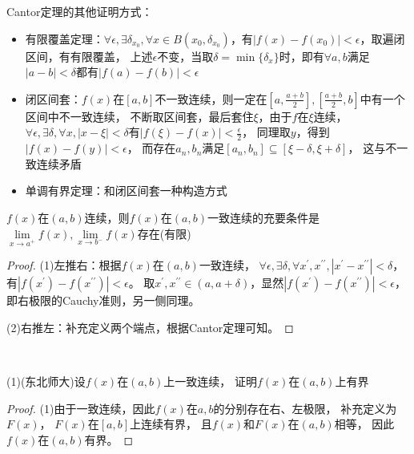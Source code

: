 \begin{note}
  Cantor定理的其他证明方式：
  \begin{itemize}
  \item 有限覆盖定理：$\forall \epsilon, \exists \delta_{x_0}, \forall x \in B(x_0,\delta_{x_0})$，有$|f(x) - f(x_0)| < \epsilon$，取遍闭区间，有有限覆盖，
    上述$\epsilon$不变，当取$\delta = \min \{\delta_x\}$时，即有$\forall a,b $满足$|a-b| < \delta$都有$|f(a) - f(b)| < \epsilon$
  \item 闭区间套：$f(x)$在$[a,b]$不一致连续，则一定在$[a,\frac{a+b}{2}],[\frac{a+b}{2},b]$中有一个区间中不一致连续，
    不断取区间套，最后套住$\xi$，由于$f$在$\xi$连续，$\forall \epsilon, \exists \delta, \forall x, |x - \xi| < \delta$有$|f(\xi) - f(x)| < \frac{\epsilon}{2}$，
    同理取$y$，得到$|f(x )- f(y)| < \epsilon$，
    而存在$a_n,b_n$满足$[a_n,b_n] \subseteq [\xi - \delta, \xi + \delta]$，
    这与不一致连续矛盾
  \item 单调有界定理：和闭区间套一种构造方式
  \end{itemize}
\end{note}



\begin{theorem}[开区间一致连续充要条件]
  $f(x)$在$(a,b)$连续，则$f(x)$在$(a,b)$一致连续的充要条件是$\lim \limits _{x \rightarrow a^+} f(x), \lim \limits _{x \rightarrow b^-}f(x)$存在(有限)
\end{theorem}

\begin{proof}
  (1)左推右：根据$f(x)$在$(a,b)$一致连续，
  $\forall \epsilon, \exists \delta, \forall x^{\prime},x^{\prime\prime}, |x^{\prime} - x^{\prime\prime}| < \delta$，有$|f(x^{\prime}) - f(x^{\prime\prime})| < \epsilon$。
  取$x^{\prime},x^{\prime\prime} \in (a,a + \delta)$，显然$|f(x^{\prime}) - f(x^{\prime\prime})| < \epsilon$，
  即右极限的Cauchy准则，另一侧同理。

  (2)右推左：补充定义两个端点，根据Cantor定理可知。
\end{proof}

~

\begin{exercise}[开区间一致连续应用]
  (1)(东北师大)设$f(x)$在$(a,b)$上一致连续，
  证明$f(x)$在$(a,b)$上有界
\end{exercise}

\begin{proof}
  (1)由于一致连续，因此$f(x)$在$a,b$的分别存在右、左极限，
  补充定义为$F(x)$，
  $F(x)$在$[a,b]$上连续有界，
  且$f(x)$和$F(x)$在$(a,b)$相等，
  因此$f(x)$在$(a,b)$有界。
\end{proof}

